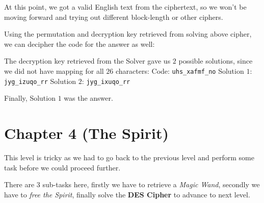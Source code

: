 \documentclass[10pt,twoside]{article}
\begin{document}
At this point, we got a valid English text from the ciphertext, so we won't be moving forward and trying out different block-length or other ciphers. \newline

Using the permutation and decryption key retrieved from solving above cipher, we can decipher the code for the answer as well: \newline

The decryption key retrieved from the Solver gave us $2$ possible solutions, since we did not have mapping for all $26$ characters: \newline
Code: \texttt{uhs\_xafmf\_no} \newline
Solution $1$: \texttt{jyg\_izuqo\_rr} \newline
Solution $2$: \texttt{jyg\_ixuqo\_rr} \newline

Finally, Solution $1$ was the answer.

\newpage
\section{Chapter 4 (The Spirit)}

This level is tricky as we had to go back to the previous level and perform some task before we could proceed further. \newline

There are 3 sub-tasks here, firstly we have to retrieve a \textit{Magic Wand}, secondly we have to \textit{free the Spirit}, finally solve the \textbf{DES Cipher} to advance to next level. \newline
\end{document}
